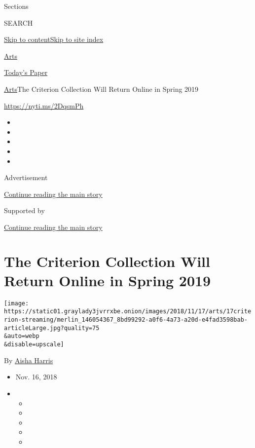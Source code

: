 Sections

SEARCH

\protect\hyperlink{site-content}{Skip to
content}\protect\hyperlink{site-index}{Skip to site index}

\href{https://www.nytimes3xbfgragh.onion/section/arts}{Arts}

\href{https://myaccount.nytimes3xbfgragh.onion/auth/login?response_type=cookie\&client_id=vi}{}

\href{https://www.nytimes3xbfgragh.onion/section/todayspaper}{Today's
Paper}

\href{/section/arts}{Arts}\textbar{}The Criterion Collection Will Return
Online in Spring 2019

\url{https://nyti.ms/2DqsmPh}

\begin{itemize}
\item
\item
\item
\item
\item
\end{itemize}

Advertisement

\protect\hyperlink{after-top}{Continue reading the main story}

Supported by

\protect\hyperlink{after-sponsor}{Continue reading the main story}

\hypertarget{the-criterion-collection-will-return-online-in-spring-2019}{%
\section{The Criterion Collection Will Return Online in Spring
2019}\label{the-criterion-collection-will-return-online-in-spring-2019}}

\texttt{[image: https://static01.graylady3jvrrxbe.onion/images/2018/11/17/arts/17criterion-streaming/merlin\_146054367\_8bd99292-a0f6-4a73-a20d-e4fad3598bab-articleLarge.jpg?quality=75\\\&auto=webp\\\&disable=upscale]}

By \href{https://www.nytimes3xbfgragh.onion/by/aisha-harris}{Aisha
Harris}

\begin{itemize}
\item
  Nov. 16, 2018
\item
  \begin{itemize}
  \item
  \item
  \item
  \item
  \item
  \end{itemize}
\end{itemize}

